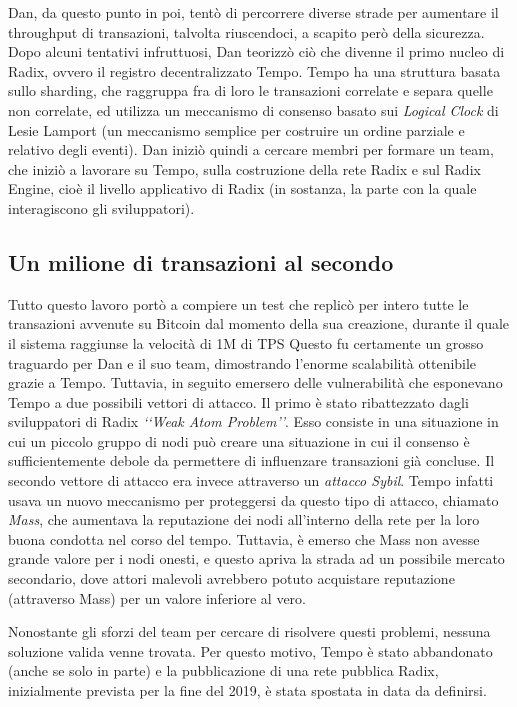 Dan, da questo punto in poi, tentò di percorrere diverse strade per aumentare il throughput di transazioni, talvolta riuscendoci, a scapito però della sicurezza. Dopo alcuni tentativi infruttuosi, Dan teorizzò ciò che divenne il primo nucleo di Radix, ovvero il registro decentralizzato Tempo. Tempo ha una struttura basata sullo sharding, che raggruppa fra di loro le transazioni correlate e separa quelle non correlate, ed utilizza un meccanismo di consenso basato sui \textit{Logical Clock} di Lesie Lamport (un meccanismo semplice per costruire un ordine parziale e relativo degli eventi). Dan iniziò quindi a cercare membri per formare un team, che iniziò a lavorare su Tempo, sulla costruzione della rete Radix e sul Radix Engine, cioè il livello applicativo di Radix (in sostanza, la parte con la quale interagiscono gli sviluppatori). 

\subsection{Un milione di transazioni al secondo}

Tutto questo lavoro portò a compiere un test che replicò per intero tutte le transazioni avvenute su Bitcoin dal momento della sua creazione, durante il quale il sistema raggiunse la velocità di 1M di TPS Questo fu certamente un grosso traguardo per Dan e il suo team, dimostrando l'enorme scalabilità ottenibile grazie a Tempo. Tuttavia, in seguito emersero delle vulnerabilità che esponevano Tempo a due possibili vettori di attacco. Il primo è stato ribattezzato dagli sviluppatori di Radix \textit{‘‘Weak Atom Problem’’}. Esso consiste in una situazione in cui un piccolo gruppo di nodi può creare una situazione in cui il consenso è sufficientemente debole da permettere di influenzare transazioni già concluse. Il secondo vettore di attacco era invece attraverso un \textit{attacco Sybil}. Tempo infatti usava un nuovo meccanismo per proteggersi da questo tipo di attacco, chiamato \textit{Mass}, che aumentava la reputazione dei nodi all'interno della rete per la loro buona condotta nel corso del tempo. Tuttavia, è emerso che Mass non avesse grande valore per i nodi onesti, e questo apriva la strada ad un possibile mercato secondario, dove attori malevoli avrebbero potuto acquistare reputazione  (attraverso Mass) per un valore inferiore al vero.

Nonostante gli sforzi del team per cercare di risolvere questi problemi, nessuna soluzione valida venne trovata. Per questo motivo, Tempo è stato abbandonato (anche se solo in parte) e la pubblicazione di una rete pubblica Radix, inizialmente prevista per la fine del 2019, è stata spostata in data da definirsi.


